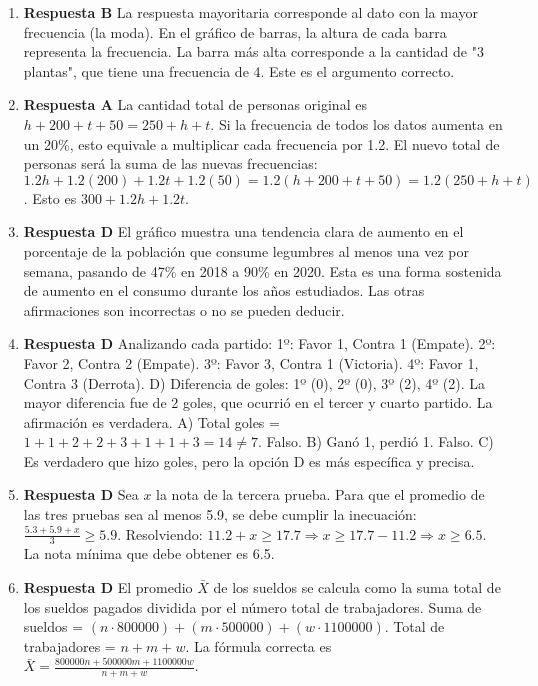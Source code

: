 \documentclass[11pt]{article}
\begin{document}
\begin{enumerate}
    \item \textbf{Respuesta B} La respuesta mayoritaria corresponde al dato con la mayor frecuencia (la moda). En el gráfico de barras, la altura de cada barra representa la frecuencia. La barra más alta corresponde a la cantidad de "3 plantas", que tiene una frecuencia de 4. Este es el argumento correcto. %
    
    \item \textbf{Respuesta A} La cantidad total de personas original es $h+200+t+50 = 250+h+t$. Si la frecuencia de todos los datos aumenta en un 20\%, esto equivale a multiplicar cada frecuencia por 1.2. El nuevo total de personas será la suma de las nuevas frecuencias: $1.2h + 1.2(200) + 1.2t + 1.2(50) = 1.2(h+200+t+50) = 1.2(250+h+t)$. Esto es $300 + 1.2h + 1.2t$. %
    
    \item \textbf{Respuesta D} El gráfico muestra una tendencia clara de aumento en el porcentaje de la población que consume legumbres al menos una vez por semana, pasando de 47\% en 2018 a 90\% en 2020. Esta es una forma sostenida de aumento en el consumo durante los años estudiados. Las otras afirmaciones son incorrectas o no se pueden deducir. %
    
    \item \textbf{Respuesta D} Analizando cada partido: 1º: Favor 1, Contra 1 (Empate). 2º: Favor 2, Contra 2 (Empate). 3º: Favor 3, Contra 1 (Victoria). 4º: Favor 1, Contra 3 (Derrota). D) Diferencia de goles: 1º (0), 2º (0), 3º (2), 4º (2). La mayor diferencia fue de 2 goles, que ocurrió en el tercer y cuarto partido. La afirmación es verdadera. A) Total goles = $1+1+2+2+3+1+1+3 = 14 \neq 7$. Falso. B) Ganó 1, perdió 1. Falso. C) Es verdadero que hizo goles, pero la opción D es más específica y precisa. %
    
    \item \textbf{Respuesta D} Sea $x$ la nota de la tercera prueba. Para que el promedio de las tres pruebas sea al menos 5.9, se debe cumplir la inecuación: $\frac{5.3+5.9+x}{3} \geq 5.9$. Resolviendo: $11.2+x \geq 17.7 \Rightarrow x \geq 17.7 - 11.2 \Rightarrow x \geq 6.5$. La nota mínima que debe obtener es 6.5. %
    
    \item \textbf{Respuesta D} El promedio $\bar{X}$ de los sueldos se calcula como la suma total de los sueldos pagados dividida por el número total de trabajadores. Suma de sueldos = $(n \cdot 800000) + (m \cdot 500000) + (w \cdot 1100000)$. Total de trabajadores = $n+m+w$. La fórmula correcta es $\bar{X} = \frac{800000n + 500000m + 1100000w}{n+m+w}$. %




\end{enumerate}
\end{document}
